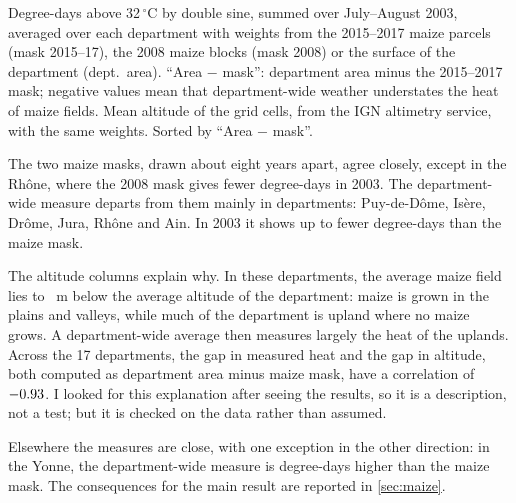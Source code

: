 \begin{table}[H]
\centering
\small
\caption{Degree-days above 32\,$^{\circ}$C in July--August 2003, by measure (main maize sample)}
\label{tab:relief}
\begin{threeparttable}
{\footnotesize\setlength{\tabcolsep}{4pt}}
\begin{tablenotes}\footnotesize
\item Degree-days above 32\,$^{\circ}$C by double sine, summed over July--August 2003, averaged over each department with weights from the 2015--2017 maize parcels (mask 2015--17), the 2008 maize blocks (mask 2008) or the surface of the department (dept.\ area). ``Area $-$ mask'': department area minus the 2015--2017 mask; negative values mean that department-wide weather understates the heat of maize fields. Mean altitude of the grid cells, from the IGN altimetry service, with the same weights. Sorted by ``Area $-$ mask''.
\end{tablenotes}
\end{threeparttable}
\end{table}

The two maize masks, drawn about eight years apart, agree closely, except in the Rhône, where the 2008 mask gives \ReliefRhoneMaskGap{} fewer degree-days in 2003. The department-wide measure departs from them mainly in \ReliefCount{} departments: Puy-de-Dôme, Isère, Drôme, Jura, Rhône and Ain. In 2003 it shows up to \ReliefGapMax{} fewer degree-days than the maize mask.

The altitude columns explain why. In these \ReliefCount{} departments, the average maize field lies \ReliefAltDiffMin{} to \ReliefAltDiffMax{}~m below the average altitude of the department: maize is grown in the plains and valleys, while much of the department is upland where no maize grows. A department-wide average then measures largely the heat of the uplands. Across the 17 departments, the gap in measured heat and the gap in altitude, both computed as department area minus maize mask, have a correlation of $-0.93$. I looked for this explanation after seeing the results, so it is a description, not a test; but it is checked on the data rather than assumed.

Elsewhere the measures are close, with one exception in the other direction: in the Yonne, the department-wide measure is \ReliefYonneGap{} degree-days higher than the maize mask. The consequences for the main result are reported in \cref{sec:maize}.
